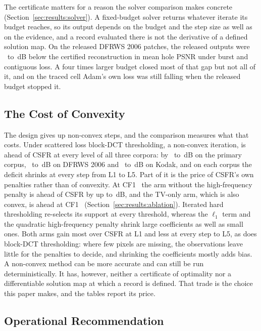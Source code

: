 \documentclass[final,3p]{elsarticle}
\begin{document}
The certificate matters for a reason the solver comparison makes concrete (Section~\ref{sec:results:solver}). A fixed-budget solver returns whatever iterate its budget reaches, so its output depends on the budget and the step size as well as on the evidence, and a record evaluated there is not the derivative of a defined solution map. On the released DFRWS 2006 patches, the released outputs were \solverGainMin\ to \solverGainMax\,dB below the certified reconstruction in mean hole PSNR under burst and contiguous loss. A four times larger budget closed most of that gap but not all of it, and on the traced cell Adam's own loss was still falling when the released budget stopped it.

\subsection{The Cost of Convexity}
\label{sec:discussion:convexity}

The design gives up non-convex steps, and the comparison measures what that costs. Under scattered loss block-DCT thresholding, a non-convex iteration, is ahead of CSFR at every level of all three corpora: by \qGovCFoneBehindMin\ to \qGovCFoneBehindMax\,dB on the primary corpus, \qDfrwsCFoneBehindMin\ to \qDfrwsCFoneBehindMax\,dB on DFRWS 2006 and \qKodakCFoneBehindMin\ to \qKodakCFoneBehindMax\,dB on Kodak, and on each corpus the deficit shrinks at every step from L1 to L5. Part of it is the price of CSFR's own penalties rather than of convexity. At CF1 \ablNoFcScatterBehindLevels\ the arm without the high-frequency penalty is ahead of CSFR by up to \ablNoFcScatterBehindMax\,dB, and the TV-only arm, which is also convex, is ahead at CF1 \ablTvScatterBehindLevels\ (Section~\ref{sec:results:ablation}). Iterated hard thresholding re-selects its support at every threshold, whereas the $\ell_1$ term and the quadratic high-frequency penalty shrink large coefficients as well as small ones. Both arms gain most over CSFR at L1 and less at every step to L5, as does block-DCT thresholding: where few pixels are missing, the observations leave little for the penalties to decide, and shrinking the coefficients mostly adds bias. A non-convex method can be more accurate and can still be run deterministically. It has, however, neither a certificate of optimality nor a differentiable solution map at which a record is defined. That trade is the choice this paper makes, and the tables report its price.

\subsection{Operational Recommendation}
\label{sec:discussion:recommendations}
\end{document}
